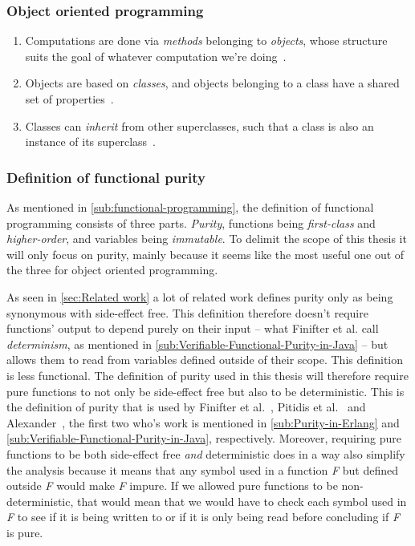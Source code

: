 \documentclass[a4paper,12pt]{article}
\begin{document}
\subsubsection{Object oriented programming} \label{ssub:object-oriented-programming} %

\begin{enumerate}
\item Computations are done via \emph{methods} belonging to \emph{objects}, whose structure suits the goal of whatever computation we're doing~\cite{john-m-chambers}.
\item Objects are based on \emph{classes}, and objects belonging to a class have a shared set of properties~\cite{john-m-chambers}.
\item Classes can \emph{inherit} from other superclasses, such that a class is also an instance of its superclass~\cite{john-m-chambers}.
\end{enumerate}

\subsubsection{Definition of functional purity} \label{ssub:functional-purity-definition}
As mentioned in \autoref{sub:functional-programming}, the definition of functional programming consists of three parts. \textit{Purity}, functions being \textit{first-class} and \textit{higher-order}, and variables being \textit{immutable}. To delimit the scope of this thesis it will only focus on purity, mainly because it seems like the most useful one out of the three for object oriented programming.%

As seen in \autoref{sec:Related work} a lot of related work defines purity only as being synonymous with side-effect free. This definition therefore doesn't require functions' output to depend purely on their input -- what Finifter et al. call \textit{determinism}, as mentioned in \autoref{sub:Verifiable-Functional-Purity-in-Java} -- but allows them to read from variables defined outside of their scope. This definition is less functional. The definition of purity used in this thesis will therefore require pure functions to not only be side-effect free but also to be deterministic. This is the definition of purity that is used by Finifter et al.~\cite{purity-in-java}, Pitidis et al.~\cite{pitidis2010purity} and Alexander~\cite{alvin-alexander}, %
the first two who's work is mentioned in \autoref{sub:Purity-in-Erlang} and \autoref{sub:Verifiable-Functional-Purity-in-Java}, respectively. Moreover, requiring pure functions to be both side-effect free \textit{and} deterministic does in a way also simplify the analysis because it means that any symbol used in a function \textit{F} but defined outside \textit{F} would make \textit{F} impure. If we allowed pure functions to be non-deterministic, that would mean that we would have to check each symbol used in \textit{F} to see if it is being written to or if it is only being read before concluding if \textit{F} is pure.
\end{document}
